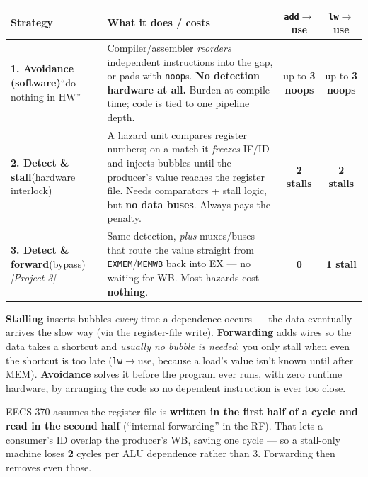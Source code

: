 \documentclass[10pt]{article}
\newcommand{\code}[1]{\texttt{\small #1}}
\begin{document}
\begin{center}
\renewcommand{\arraystretch}{1.25}\footnotesize
\begin{tabular}{@{}p{} p{} c c@{}}
\toprule
\textbf{Strategy} & \textbf{What it does / costs} & \textbf{\code{add}$\to$use} & \textbf{\code{lw}$\to$use}\\
\midrule
\textbf{1. Avoidance (software)}\newline ``do nothing in HW'' &
Compiler/assembler \emph{reorders} independent instructions into the gap, or pads with
\code{noop}s. \textbf{No detection hardware at all.} Burden at compile time; code is tied to one
pipeline depth. & up to \textbf{3 noops} & up to \textbf{3 noops}\\
\addlinespace
\textbf{2. Detect \& stall}\newline (hardware interlock) &
A hazard unit compares register numbers; on a match it \emph{freezes} IF/ID and injects
bubbles until the producer's value reaches the register file. Needs comparators + stall logic, but
\textbf{no data buses}. Always pays the penalty. & \textbf{2 stalls} & \textbf{2 stalls}\\
\addlinespace
\textbf{3. Detect \& forward}\newline (bypass) \emph{[Project 3]} &
Same detection, \emph{plus} muxes/buses that route the value straight from \code{EXMEM}/\code{MEMWB}
back into EX --- no waiting for WB. Most hazards cost \textbf{nothing}. & \textbf{0} & \textbf{1 stall}\\
\bottomrule
\end{tabular}
\end{center}

\begin{keybox}
\textbf{Stalling} inserts bubbles \emph{every} time a dependence occurs --- the data eventually
arrives the slow way (via the register-file write). \textbf{Forwarding} adds wires so the data
takes a shortcut and \emph{usually no bubble is needed}; you only stall when even the shortcut is
too late (\code{lw}$\to$use, because a load's value isn't known until after MEM). \textbf{Avoidance}
solves it before the program ever runs, with zero runtime hardware, by arranging the code so no
dependent instruction is ever too close.
\end{keybox}

\begin{tipbox}
EECS 370 assumes the register file is \textbf{written in the first half of a cycle and read in the
second half} (``internal forwarding'' in the RF). That lets a consumer's ID overlap the producer's
WB, saving one cycle --- so a stall-only machine loses \textbf{2} cycles per ALU dependence rather
than 3. Forwarding then removes even those.
\end{tipbox}
\end{document}
